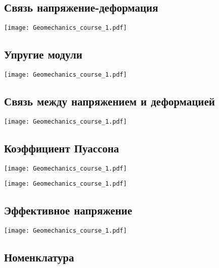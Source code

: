 \documentclass[main.tex]{subfiles}
\begin{document}
\subsection{Связь напряжение-деформация}

\begin{center}
\texttt{[image: Geomechanics\_course\_1.pdf]}
\end{center}

\subsection{Упругие модули}

\begin{center}
\texttt{[image: Geomechanics\_course\_1.pdf]}
\end{center}

\subsection{Связь между напряжением и деформацией}

\begin{center}
\texttt{[image: Geomechanics\_course\_1.pdf]}
\end{center}

\subsection{Коэффициент Пуассона}

\begin{center}
\texttt{[image: Geomechanics\_course\_1.pdf]}
\end{center}

\begin{center}
\texttt{[image: Geomechanics\_course\_1.pdf]}
\end{center}

\subsection{Эффективное напряжение}

\begin{center}
\texttt{[image: Geomechanics\_course\_1.pdf]}
\end{center}

\subsection{Номенклатура}
\end{document}
